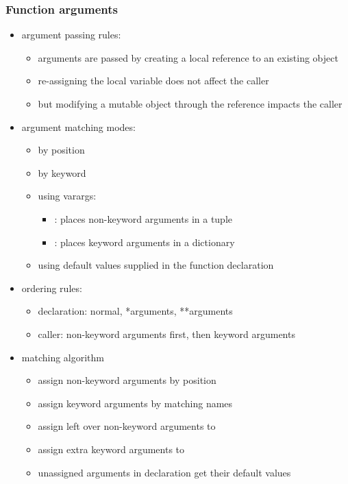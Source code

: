 \begin{frame}[fragile]
%
  \frametitle{Function arguments}
%
  \begin{itemize}
%
  \item argument passing rules:
    \begin{itemize}
    \item arguments are passed by creating a local reference to an existing object
    \item re-assigning the local variable does not affect the caller
    \item but modifying a mutable object through the reference impacts the caller
    \end{itemize}
%
  \item argument matching modes:
    \begin{itemize}
    \item by position
    \item by keyword
    \item using varargs:
      \begin{itemize}
      \item \keyword{*}: places non-keyword arguments in a tuple
      \item \keyword{**}: places keyword arguments in a dictionary
      \end{itemize}
    \item using default values supplied in the function declaration
    \end{itemize}
%
  \item ordering rules:
    \begin{itemize}
    \item declaration: normal, *arguments, **arguments
    \item caller: non-keyword arguments first, then keyword arguments
    \end{itemize}
%
    \item matching algorithm
      \begin{itemize}
      \item assign non-keyword arguments by position
      \item assign keyword arguments by matching names
      \item assign left over non-keyword arguments to 
      \item assign extra keyword arguments to 
      \item unassigned arguments in declaration get their default values
      \end{itemize}
      
  \end{itemize}
%
\end{frame}

